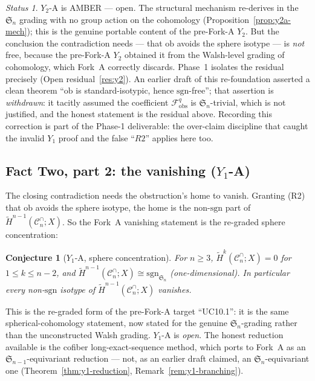 \documentclass[11pt,oneside]{amsart}
\theoremstyle{plain}
\newtheorem{conjecture}[theorem]{Conjecture}
\theoremstyle{definition}
\theoremstyle{remark}
\theoremstyle{honeststyle}
\newtheorem{status}[theorem]{Status}
\newcommand{\sgn}{\mathrm{sgn}}
\newcommand{\Sym}{\mathfrak{S}}
\newcommand{\Cn}{\mathcal{C}^{\cap}_n}
\newcommand{\ob}{\mathrm{ob}}
\newcommand{\fobs}{\mathcal{F}_{\mathrm{obs}}}
\begin{document}
\begin{status}
\label{status:y2a}
$Y_2$-A is \textsf{AMBER --- open}. The structural mechanism re-derives
in the $\Sym_n$ grading with no group action on the cohomology
(Proposition~\ref{prop:y2a-mech}); this is the genuine portable
content of the pre-Fork-A $Y_2$. But the conclusion the contradiction
needs --- that $\ob$ avoids the sphere isotype --- is \emph{not} free,
because the pre-Fork-A $Y_2$ obtained it from the Walsh-level grading
of cohomology, which Fork~A correctly discards. Phase~1 isolates the
residual precisely (Open residual~\ref{res:y2}). An earlier draft of
this re-foundation asserted a clean theorem ``$\ob$ is
standard-isotypic, hence $\sgn$-free''; that assertion is
\emph{withdrawn}: it tacitly assumed the coefficient $\fobs^{q}$ is
$\Sym_n$-trivial, which is not justified, and the honest statement is
the residual above. Recording this correction is part of the Phase-1
deliverable: the over-claim discipline that caught the invalid $Y_1$
proof and the false ``$R2$'' applies here too.
\end{status}

\subsection{Fact Two, part 2: the vanishing ($Y_1$-A)}
\label{ssec:y1a}

The closing contradiction needs the obstruction's home to vanish.
Granting (R2) that $\ob$ avoids the sphere isotype, the home is the
non-$\sgn$ part of $\widetilde H^{n-1}(\Cn;X)$. So the Fork~A
vanishing statement is the re-graded sphere concentration:

\begin{conjecture}[$Y_1$-A, sphere concentration]
\label{conj:y1a}
For $n\ge3$, $\widetilde H^{k}(\Cn;X)=0$ for $1\le k\le n-2$, and
$\widetilde H^{n-1}(\Cn;X)\cong\sgn_{\Sym_n}$ (one-dimensional). In
particular every non-$\sgn$ isotype of $\widetilde H^{n-1}(\Cn;X)$
vanishes.
\end{conjecture}

This is the re-graded form of the pre-Fork-A target ``UC10.1'': it is
the same spherical-cohomology statement, now stated for the genuine
$\Sym_n$-grading rather than the unconstructed Walsh grading.
$Y_1$-A is \emph{open}. The honest reduction available is the cofiber
long-exact-sequence method, which ports to Fork~A as an
$\Sym_{n-1}$-equivariant reduction --- not, as an earlier draft
claimed, an $\Sym_n$-equivariant one (Theorem~\ref{thm:y1-reduction},
Remark~\ref{rem:y1-branching}).
\end{document}
